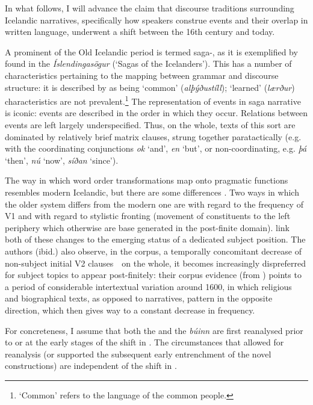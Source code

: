 \documentclass[output=paper,colorlinks,citecolor=brown]{langscibook}
\begin{document}
In what follows, I will advance the claim that discourse traditions surrounding Icelandic narratives, specifically how speakers construe events and their overlap in written language, underwent a shift between the 16th century and today.

A prominent   of the Old Icelandic period is termed saga-, as it is exemplified by  found in the \textit{Íslendingasögur} (`Sagas of the Icelanders'). This  has a number of characteristics pertaining to the mapping between grammar and discourse structure: it is described by \citet{hauksson1994islensk} as being `common' (\textit{alþýðustíll}); `learned' (\textit{lærður}) characteristics are not prevalent.\footnote{`Common' refers to the language of the common people.} The representation of events in saga  narrative is iconic: events are described in the order in which they occur. Relations between events are left largely underspecified. Thus, on the whole, texts of this sort are dominated by relatively brief matrix clauses, strung together paratactically (e.g. with the coordinating conjunctions \textit{ok} `and', \textit{en} `but', or non-coordinating, e.g. \textit{þá} `then', \textit{nú} `now', \textit{síðan} `since'). %

The way in which word order transformations map onto pragmatic functions resembles modern Icelandic, but there are some differences \citep{holm1967epoker, hauksson1994islensk}. Two ways in which the older system differs from the modern one are with regard to the frequency of V1 and with regard to stylistic fronting (movement of constituents to the left periphery which otherwise are base generated in the post-finite domain). \citet{booth-beck20200jhs} link both of these changes to the emerging status of a dedicated subject position. The authors (ibid.) also observe, in the  corpus, a temporally concomitant decrease of non-subject initial V2 clauses\ \textendash{}\  on the whole, it becomes increasingly dispreferred for subject topics to appear post-finitely: their corpus evidence (from ) points to a period of considerable intertextual variation around 1600, in which religious and biographical texts, as opposed to narratives, pattern in the opposite direction, which then gives way to a constant decrease in frequency.

For concreteness, I assume that both the   and the \textit{búinn}   are first reanalysed prior to or at the early stages of the shift in . The circumstances that allowed for reanalysis (or supported the subsequent early entrenchment of the novel constructions) are independent of the shift in . 
\end{document}
